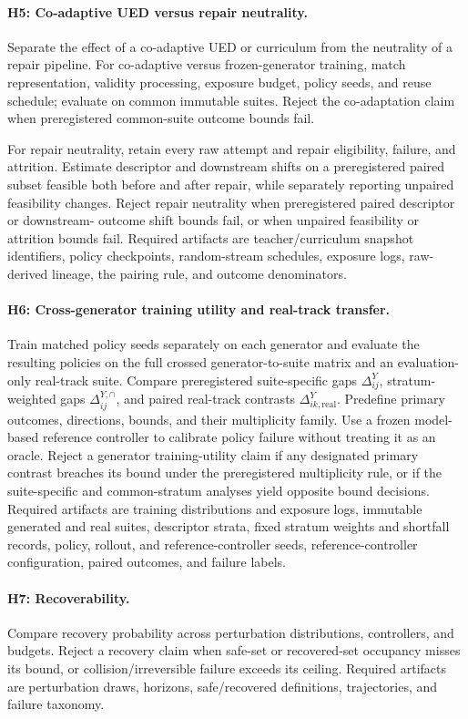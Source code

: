 \paragraph{H5: Co-adaptive UED versus repair neutrality.}
Separate the effect of a co-adaptive UED or curriculum from the neutrality of a repair
pipeline. For co-adaptive versus frozen-generator training, match representation,
validity processing, exposure budget, policy seeds, and reuse schedule; evaluate on
common immutable suites. Reject the co-adaptation claim when preregistered common-suite
outcome bounds fail.

For repair neutrality, retain every raw attempt and repair eligibility, failure, and
attrition. Estimate descriptor and downstream shifts on a preregistered paired subset
feasible both before and after repair, while separately reporting unpaired feasibility
changes. Reject repair neutrality when preregistered paired descriptor or downstream-
outcome shift bounds fail, or when unpaired feasibility or attrition bounds fail.
Required artifacts are teacher/curriculum snapshot identifiers, policy checkpoints,
random-stream schedules, exposure logs, raw-derived lineage, the pairing rule, and
outcome denominators.

\paragraph{H6: Cross-generator training utility and real-track transfer.}
Train matched policy seeds separately on each generator and evaluate the resulting
policies on the full crossed generator-to-suite matrix and an evaluation-only
real-track suite. Compare preregistered suite-specific gaps $\Delta^Y_{ij}$,
stratum-weighted gaps $\Delta^{Y,\cap}_{ij}$, and paired real-track contrasts
$\Delta^Y_{ik,\mathrm{real}}$. Predefine primary outcomes, directions, bounds, and
their multiplicity family. Use a frozen model-based reference controller to calibrate
policy failure without treating it as an oracle. Reject a generator training-utility
claim if any designated primary contrast breaches its bound under the preregistered
multiplicity rule, or if the suite-specific and common-stratum analyses yield opposite
bound decisions.
Required artifacts are training distributions and exposure logs, immutable generated
and real suites, descriptor strata, fixed stratum weights
and shortfall records, policy, rollout, and reference-controller seeds,
reference-controller configuration, paired outcomes, and failure labels.

\paragraph{H7: Recoverability.}
Compare recovery probability across perturbation distributions, controllers, and
budgets. Reject a recovery claim when safe-set or recovered-set occupancy misses its
bound, or collision/irreversible failure exceeds its ceiling. Required artifacts are
perturbation draws, horizons, safe/recovered definitions, trajectories, and failure
taxonomy.

